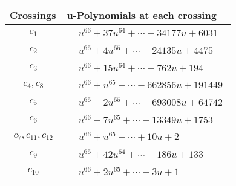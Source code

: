 \documentclass[1p]{elsarticle_modified}
\theoremstyle{definition}
\begin{document}
\begin{tabular}{m{50pt}|m{274pt}}
Crossings & \hspace{64pt}u-Polynomials at each crossing \\
\hline $$\begin{aligned}c_{1}\end{aligned}$$&$\begin{aligned}
&u^{66}+37 u^{64}+\cdots+34177 u+6031
\end{aligned}$\\
\hline $$\begin{aligned}c_{2}\end{aligned}$$&$\begin{aligned}
&u^{66}+4 u^{65}+\cdots-24135 u+4475
\end{aligned}$\\
\hline $$\begin{aligned}c_{3}\end{aligned}$$&$\begin{aligned}
&u^{66}+15 u^{64}+\cdots-762 u+194
\end{aligned}$\\
\hline $$\begin{aligned}c_{4},c_{8}\end{aligned}$$&$\begin{aligned}
&u^{66}+u^{65}+\cdots-662856 u+191449
\end{aligned}$\\
\hline $$\begin{aligned}c_{5}\end{aligned}$$&$\begin{aligned}
&u^{66}-2 u^{65}+\cdots+693008 u+64742
\end{aligned}$\\
\hline $$\begin{aligned}c_{6}\end{aligned}$$&$\begin{aligned}
&u^{66}-7 u^{65}+\cdots+13349 u+1753
\end{aligned}$\\
\hline $$\begin{aligned}c_{7},c_{11},c_{12}\end{aligned}$$&$\begin{aligned}
&u^{66}+u^{65}+\cdots+10 u+2
\end{aligned}$\\
\hline $$\begin{aligned}c_{9}\end{aligned}$$&$\begin{aligned}
&u^{66}+42 u^{64}+\cdots-186 u+133
\end{aligned}$\\
\hline $$\begin{aligned}c_{10}\end{aligned}$$&$\begin{aligned}
&u^{66}+2 u^{65}+\cdots-3 u+1
\end{aligned}$\\
\hline
\end{tabular}\\~\\
\end{document}
